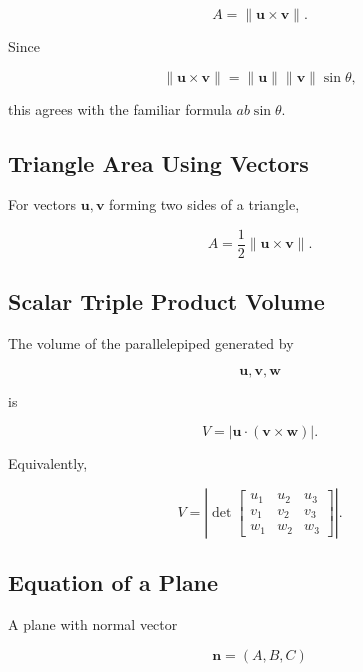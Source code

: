 \[
\boxed{
A
=
\|\mathbf{u}\times\mathbf{v}\|.
}
\]

Since

\[
\|\mathbf{u}\times\mathbf{v}\|
=
\|\mathbf{u}\|
\|\mathbf{v}\|
\sin\theta,
\]

this agrees with the familiar formula \(ab\sin\theta\).

\subsection{Triangle Area Using Vectors}
\label{subsec:triangle-vector-area}

For vectors \(\mathbf{u},\mathbf{v}\) forming two sides of a triangle,

\[
\boxed{
A
=
\frac12
\|\mathbf{u}\times\mathbf{v}\|.
}
\]

\subsection{Scalar Triple Product Volume}
\label{subsec:scalar-triple-product-volume}

The volume of the parallelepiped generated by

\[
\mathbf{u},
\mathbf{v},
\mathbf{w}
\]

is

\[
\boxed{
V
=
|
\mathbf{u}\cdot
(\mathbf{v}\times\mathbf{w})
|.
}
\]

Equivalently,

\[
\boxed{
V
=
\left|
\det
\begin{bmatrix}
u_1 & u_2 & u_3\\
v_1 & v_2 & v_3\\
w_1 & w_2 & w_3
\end{bmatrix}
\right|.
}
\]

\subsection{Equation of a Plane}
\label{subsec:plane-equation-reference}

A plane with normal vector

\[
\mathbf{n}
=
(A,B,C)
\]

